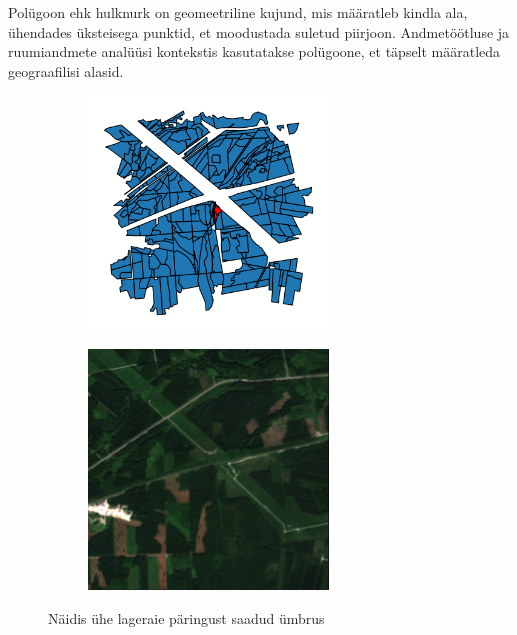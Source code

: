 Polügoon ehk hulknurk on geomeetriline kujund, mis määratleb kindla ala, ühendades üksteisega
punktid, et moodustada suletud piirjoon. Andmetöötluse ja ruumiandmete analüüsi
kontekstis kasutatakse polügoone, et täpselt määratleda geograafilisi alasid. \cite{WhatLocationPolygon}


\begin{figure}[H]
    \centering
    \begin{subfigure}[b]{0.7\textwidth} %
        \centering
        \includegraphics[width=0.7\textwidth]{figures/andmestik/er_id_is_3308099.png}
        \caption{}
        \label{fig:umbrusexample}
    \end{subfigure}
    \begin{subfigure}{0.7\textwidth} 
        \centering
        \includegraphics[width=0.7\textwidth]{figures/andmestik/lr_3308099_TCI.png}
        \caption{} %
        \label{fig:satellite_example}
    \end{subfigure}

    \label{fig:sidebyside_teatis_sat_img}
    \caption{Näidis ühe lageraie päringust saadud ümbrus}
\end{figure}

